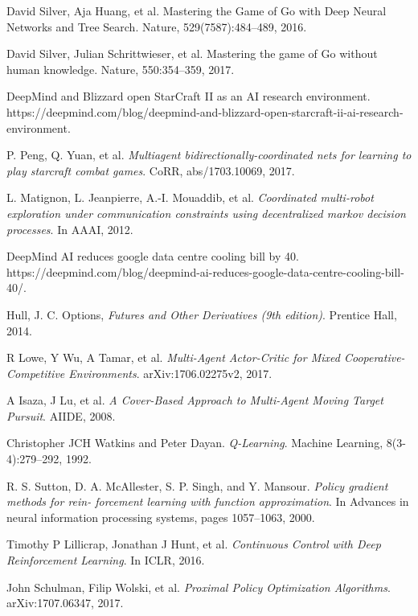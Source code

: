 \documentclass[11pt,twocolumn]{jarticle} %
\begin{document}
\begin{thebibliography}{99}

David Silver, Aja Huang, et al. Mastering the Game of Go with Deep Neural Networks and Tree Search. Nature, 529(7587):484–489, 2016.

David Silver, Julian Schrittwieser, et al. Mastering the game of Go without human knowledge. Nature, 550:354–359, 2017.

DeepMind and Blizzard open StarCraft II as an AI research environment. https://deepmind.com/blog/deepmind-and-blizzard-open-starcraft-ii-ai-research-environment.

 P. Peng, Q. Yuan, et al. \textsl{Multiagent bidirectionally-coordinated nets for learning to play starcraft combat games}. CoRR, abs/1703.10069, 2017.

L. Matignon, L. Jeanpierre, A.-I. Mouaddib, et al. \textsl{Coordinated multi-robot exploration under
communication constraints using decentralized markov decision processes}. In AAAI, 2012.

DeepMind AI reduces google data centre cooling bill by 40. https://deepmind.com/blog/deepmind-ai-reduces-google-data-centre-cooling-bill-40/.

Hull, J. C. Options, \textsl{Futures and Other Derivatives (9th edition)}. Prentice Hall, 2014.

R Lowe, Y Wu, A Tamar, et al. \textsl{Multi-Agent Actor-Critic for Mixed Cooperative-Competitive Environments}. arXiv:1706.02275v2, 2017.

A Isaza, J Lu, et al. \textsl{A Cover-Based Approach to Multi-Agent Moving Target Pursuit}. AIIDE, 2008.

Christopher JCH Watkins and Peter Dayan. \textsl{Q-Learning}. Machine Learning, 8(3-4):279–292, 1992.

R. S. Sutton, D. A. McAllester, S. P. Singh, and Y. Mansour. \textsl{Policy gradient methods for rein-
forcement learning with function approximation}. In Advances in neural information processing systems, pages 1057–1063, 2000.

Timothy P Lillicrap, Jonathan J Hunt, et al. \textsl{Continuous Control with Deep Reinforcement Learning}. In ICLR, 2016.

John Schulman, Filip Wolski, et al. \textsl{Proximal Policy Optimization Algorithms}. arXiv:1707.06347, 2017.


\end{thebibliography}
\end{document}

